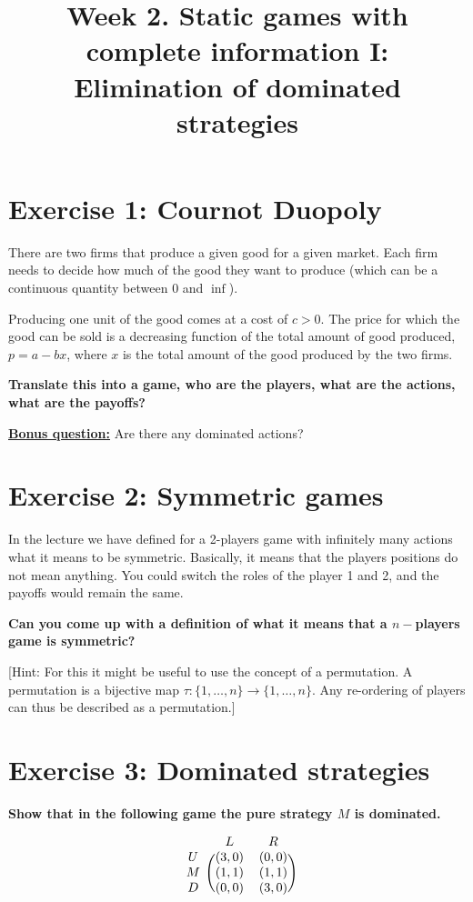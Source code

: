 \documentclass[10pt]{article}
\title{\textbf{Week 2.} Static games with complete information I: Elimination of dominated strategies}
\date{}
\begin{document}
\maketitle
\vspace{-1cm}

\section*{Exercise 1: Cournot Duopoly}
There are two firms that produce a given good for a given market. Each firm needs
to decide how much of the good they want to produce (which can be a continuous quantity between 0 and \(\inf\)).

Producing one unit of the good comes at a cost of \(c > 0\). The price for which the
good can be sold is a decreasing function of the total amount of good produced,
\(p = a - b x\), where \(x\) is the total amount of the good produced by the
two firms.

\textbf{Translate this into a game, who are the players, what are the actions, what are the payoffs?}

\underline{\textbf{Bonus question:}} Are there any dominated actions?


\section*{Exercise 2: Symmetric games}
In the lecture we have defined for a 2-players game with infinitely many actions
what it means to be symmetric. Basically, it means that the players positions do not
mean anything. You could switch the roles of the player 1 and 2, and the payoffs would
remain the same.

\textbf{Can you come up with a definition of what it means that a \(n-\)players game is symmetric?}

[Hint: For this it might be useful to use the concept of a permutation. A permutation
is a bijective map \(\tau: \{1, \dots, n\} \rightarrow \{1, \dots, n\}\). Any re-ordering
of players can thus be described as a permutation.]


\section{Exercise 3: Dominated strategies}
\textbf{Show that in the following game the pure strategy \(M\) is dominated.}

\[
\begin{blockarray}{ccc}
& L & R \\
\begin{block}{c(cc)}
    U & (3, 0) & (0, 0) \\
    M & (1, 1) & (1, 1) \\
    D & (0, 0) & (3, 0) \\
\end{block}
\end{blockarray}
\]
\end{document}
